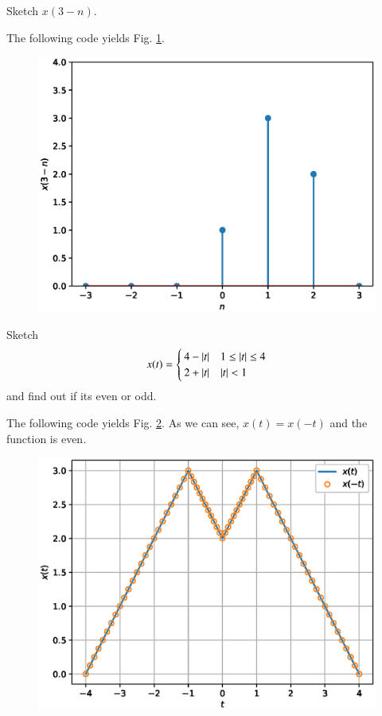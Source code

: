 \documentclass[journal,12pt,twocolumn]{IEEEtran}
\begin{document}
%
\begin{problem}
\label{prob1.end}
Sketch $x(3-n)$.
\end{problem}
\solution The following code yields Fig. \ref{fig_3d}.

\begin{figure}[!h]
\begin{center}
\includegraphics[width=\columnwidth]{./figs/3d}
\end{center}
\label{fig_3d}	
\end{figure}
%
\begin{problem}
Sketch 
\begin{equation}
x(t) = 
\begin{cases}
4 - \left\vert t\right\vert & 1 \leq \left\vert t\right\vert \leq 4 \\
2 + \left\vert t\right\vert & \left\vert t\right\vert < 1
\end{cases}
\end{equation}
%
and find out if its even or odd.
\end{problem}
\solution The following code yields Fig. \ref{fig_4a}. As we can see, $x(t)=x(-t)$ and the function is even.

\begin{figure}[!h]
\begin{center}
\includegraphics[width=\columnwidth]{./figs/4a}
\end{center}
\label{fig_4a}	
\end{figure}
%
\end{document}
